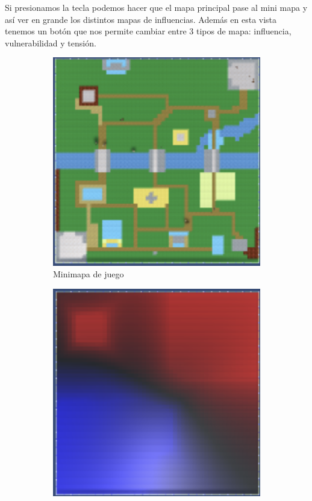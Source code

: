 Si presionamos la tecla  podemos hacer que el mapa principal pase al mini mapa y así ver en grande los distintos mapas de influencias.  Además en esta vista tenemos un botón que nos permite cambiar entre 3 tipos de mapa: influencia, vulnerabilidad y tensión.
\begin{figure}
     \centering
     \begin{subfigure}[b]{0.3\textwidth}
         \centering
         \includegraphics[scale=0.3]{doc/images/MapaNormal.png}
         \caption{Minimapa de juego}
         \label{fig:y equals x}
     \end{subfigure}
     \hfill
     \begin{subfigure}[b]{0.3\textwidth}
         \centering
         \includegraphics[scale=0.3]{doc/images/InfluenciaMap.png}

\end{subfigure}
\end{figure}
